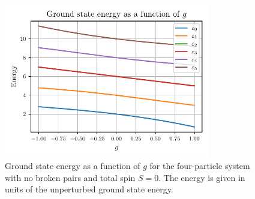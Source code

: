 \begin{figure}[htbp]
    \centering
    \includegraphics[width=0.8\textwidth]{figures/ground_state_energy.pdf}
    \caption{
        Ground state energy as a function of $g$ for the four-particle system with no broken pairs and total spin $S = 0$.
        The energy is given in units of the unperturbed ground state energy.\label{fig:groundstate}
    }
\end{figure}
